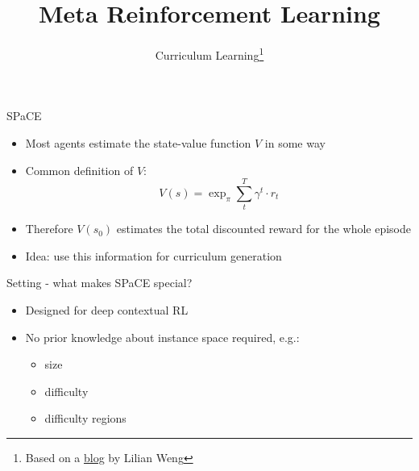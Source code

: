 


\title[Meta-RL]{Meta Reinforcement Learning}
\subtitle{Curriculum Learning\footnote{Based on a \href{https://lilianweng.github.io/lil-log/2020/01/29/curriculum-for-reinforcement-learning.html}{blog} by Lilian Weng}}



	
	\maketitle

\begin{frame}[c]{SPaCE~}
	
	\begin{itemize}
		\item Most agents estimate the state-value function $V$ in some way
		\item Common definition of $V$: 
			$$ V(s) = \exp_{\pi} \sum_t^T \gamma^t \cdot r_t $$
		\item Therefore $V(s_0)$ estimates the total discounted reward for the whole episode
		\item Idea: use this information for curriculum generation
	\end{itemize}
	
\end{frame}


\begin{frame}[c]{Setting - what makes SPaCE special?}
	
	\begin{itemize}
		\item Designed for deep contextual RL
		\item No prior knowledge about instance space required, e.g.:
		\begin{itemize}
			\item size
			\item difficulty
			\item difficulty regions
		\end{itemize}
	\end{itemize}
	
\end{frame}

